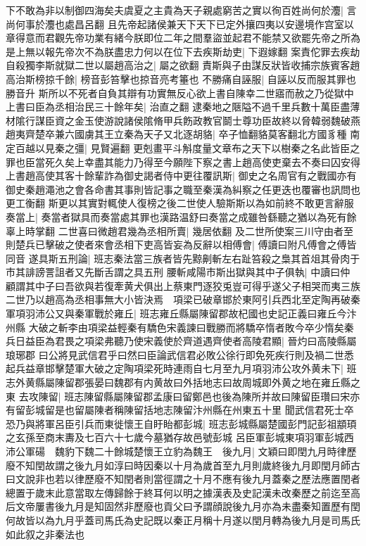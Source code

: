 下不敢為非以制御四海矣夫虞夏之主貴為天子親處窮苦之實以徇百姓尚何於灋|{
	言尚何事於灋也處昌呂翻}
且先帝起諸侯兼天下天下已定外攘四夷以安邊境作宫室以章得意而君觀先帝功業有緒今朕即位二年之間羣盜並起君不能禁又欲罷先帝之所為是上無以報先帝次不為朕盡忠力何以在位下去疾斯劫吏|{
	下遐嫁翻}
案責佗罪去疾劫自殺獨李斯就獄二世以屬趙高治之|{
	屬之欲翻}
責斯與子由謀反狀皆收捕宗族賓客趙高治斯榜掠千餘|{
	榜音彭笞擊也掠音亮考箠也}
不勝痛自誣服|{
	自誣以反而服其罪也勝音升}
斯所以不死者自負其辯有功實無反心欲上書自陳幸二世寤而赦之乃從獄中上書曰臣為丞相治民三十餘年矣|{
	治直之翻}
逮秦地之陿隘不過千里兵數十萬臣盡薄材隂行謀臣資之金玉使游說諸侯隂脩甲兵飭政教官鬬士尊功臣故終以脅韓弱魏破燕趙夷齊楚卒兼六國虜其王立秦為天子又北逐胡貉|{
	卒子恤翻貉莫客翻北方國豸種}
南定百越以見秦之彊|{
	見賢遍翻}
更剋畫平斗斛度量文章布之天下以樹秦之名此皆臣之罪也臣當死久矣上幸盡其能力乃得至今願陛下察之書上趙高使吏棄去不奏曰囚安得上書趙高使其客十餘輩詐為御史謁者侍中更往覆訊斯|{
	御史之名周官有之戰國亦有御史秦趙澠池之會各命書其事則皆記事之職至秦漢為糾察之任更迭也覆審也訊問也更工衡翻}
斯更以其實對輒使人復榜之後二世使人驗斯斯以為如前終不敢更言辭服奏當上|{
	奏當者獄具而奏當處其罪也漢路温舒曰奏當之成雖咎繇聽之猶以為死有餘辜上時掌翻}
二世喜曰微趙君幾為丞相所賣|{
	幾居依翻}
及二世所使案三川守由者至則楚兵已擊破之使者來會丞相下吏高皆妄為反辭以相傅會|{
	傅讀曰附凡傅會之傅皆同音}
遂具斯五刑論|{
	班志秦法當三族者皆先黥劓斬左右趾笞殺之梟其首俎其骨肉于市其誹謗詈詛者又先斷舌謂之具五刑}
腰斬咸陽市斯出獄與其中子俱執|{
	中讀曰仲}
顧謂其中子曰吾欲與若復牽黄犬俱出上蔡東門逐狡兎豈可得乎遂父子相哭而夷三族二世乃以趙高為丞相事無大小皆決焉　項梁已破章邯於東阿引兵西北至定陶再破秦軍項羽沛公又與秦軍戰於雍丘|{
	班志雍丘縣屬陳留郡故杞國也史記正義曰雍丘今汴州縣}
大破之斬李由項梁益輕秦有驕色宋義諫曰戰勝而將驕卒惰者敗今卒少惰矣秦兵日益臣為君畏之項梁弗聽乃使宋義使於齊道遇齊使者高陵君顯|{
	晉灼曰高陵縣屬琅琊郡}
曰公將見武信君乎曰然曰臣論武信君必敗公徐行即免死疾行則及禍二世悉起兵益章邯擊楚軍大破之定陶項梁死時連雨自七月至九月項羽沛公攻外黄未下|{
	班志外黄縣屬陳留郡張晏曰魏郡有内黄故曰外括地志曰故周城即外黄之地在雍丘縣之東}
去攻陳留|{
	班志陳留縣屬陳留郡孟康曰留鄭邑也後為陳所并故曰陳留臣瓚曰宋亦有留彭城留是也留屬陳者稱陳留括地志陳留汴州縣在州東五十里}
聞武信君死士卒恐乃與將軍呂臣引兵而東徙懷王自盱眙都彭城|{
	班志彭城縣屬楚國彭門記彭祖顓頊之玄孫至商末夀及七百六十七歲今墓猶存故邑號彭城}
呂臣軍彭城東項羽軍彭城西沛公軍碭　魏豹下魏二十餘城楚懷王立豹為魏王　後九月|{
	文穎曰即閏九月時律歷廢不知閏故謂之後九月如淳曰時因秦以十月為歲首至九月則歲終後九月即閏月師古曰文說非也若以律歷廢不知閏者則當徑謂之十月不應有後九月蓋秦之歷法應置閏者總置于歲末此意當取左傳歸餘于終耳何以明之據漢表及史記漢未改秦歷之前迄至高后文帝屢書後九月是知固然非歷廢也貢父曰予謂顔說後九月亦為未盡秦知置歷有閏何故皆以為九月乎蓋司馬氏為史記既以秦正月稱十月遂以閏月轉為後九月是司馬氏如此叙之非秦法也}
